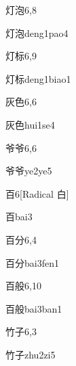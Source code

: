 \begin{entry}{灯泡}{6,8}
  \begin{phonetics}{灯泡}{deng1pao4}
  \end{phonetics}
\end{entry}

\begin{entry}{灯标}{6,9}
  \begin{phonetics}{灯标}{deng1biao1}
  \end{phonetics}
\end{entry}

\begin{entry}{灰色}{6,6}
  \begin{phonetics}{灰色}{hui1se4}
  \end{phonetics}
\end{entry}

\begin{entry}{爷爷}{6,6}
  \begin{phonetics}{爷爷}{ye2ye5}
  \end{phonetics}
\end{entry}

\begin{entry}{百}{6}[Radical 白]
  \begin{phonetics}{百}{bai3}
  \end{phonetics}
\end{entry}

\begin{entry}{百分}{6,4}
  \begin{phonetics}{百分}{bai3fen1}
  \end{phonetics}
\end{entry}

\begin{entry}{百般}{6,10}
  \begin{phonetics}{百般}{bai3ban1}
  \end{phonetics}
\end{entry}

\begin{entry}{竹子}{6,3}
  \begin{phonetics}{竹子}{zhu2zi5}
  \end{phonetics}
\end{entry}

